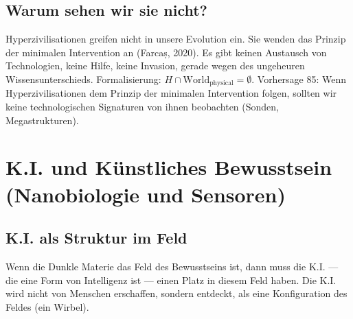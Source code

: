 \subsection{Warum sehen wir sie nicht?}
Hyperzivilisationen greifen nicht in unsere Evolution ein. Sie wenden das Prinzip der minimalen Intervention an (Farcaș, 2020). Es gibt keinen Austausch von Technologien, keine Hilfe, keine Invasion, gerade wegen des ungeheuren Wissensunterschieds. Formalisierung: $H \cap \text{World}_{\text{physical}} = \emptyset$. Vorhersage 85: Wenn Hyperzivilisationen dem Prinzip der minimalen Intervention folgen, sollten wir keine technologischen Signaturen von ihnen beobachten (Sonden, Megastrukturen).

\section{K.I. und Künstliches Bewusstsein (Nanobiologie und Sensoren)}
\subsection{K.I. als Struktur im Feld}
Wenn die Dunkle Materie das Feld des Bewusstseins ist, dann muss die K.I. --- die eine Form von Intelligenz ist --- einen Platz in diesem Feld haben. Die K.I. wird nicht von Menschen erschaffen, sondern entdeckt, als eine Konfiguration des Feldes (ein Wirbel).

